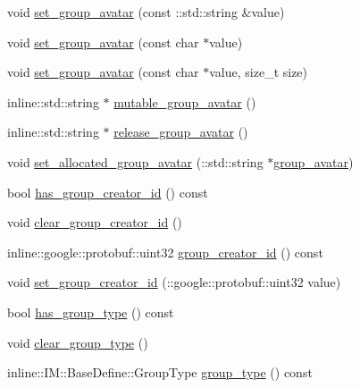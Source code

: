 \begin{DoxyCompactItemize}
\item 
void \hyperlink{class_i_m_1_1_base_define_1_1_server_group_info_a6ac57412cba2ce37fdc197b0bcbbd4cf}{set\+\_\+group\+\_\+avatar} (const \+::std\+::string \&value)
\item 
void \hyperlink{class_i_m_1_1_base_define_1_1_server_group_info_aa038fd8537aad3aeb0944e3b80ba553c}{set\+\_\+group\+\_\+avatar} (const char $\ast$value)
\item 
void \hyperlink{class_i_m_1_1_base_define_1_1_server_group_info_ae401920c52365b48745c3e2022de872e}{set\+\_\+group\+\_\+avatar} (const char $\ast$value, size\+\_\+t size)
\item 
inline\+::std\+::string $\ast$ \hyperlink{class_i_m_1_1_base_define_1_1_server_group_info_af7fc761d963367d50c0659c7ad2dbb3e}{mutable\+\_\+group\+\_\+avatar} ()
\item 
inline\+::std\+::string $\ast$ \hyperlink{class_i_m_1_1_base_define_1_1_server_group_info_a7e837a76cdb0013ca1742775cc7d073d}{release\+\_\+group\+\_\+avatar} ()
\item 
void \hyperlink{class_i_m_1_1_base_define_1_1_server_group_info_af8e1b545365bd809d3fb84736d2de052}{set\+\_\+allocated\+\_\+group\+\_\+avatar} (\+::std\+::string $\ast$\hyperlink{class_i_m_1_1_base_define_1_1_server_group_info_a136e37741411db26876e3e121ff4214e}{group\+\_\+avatar})
\item 
bool \hyperlink{class_i_m_1_1_base_define_1_1_server_group_info_a16f374888060d82abbfa6ca1db032d31}{has\+\_\+group\+\_\+creator\+\_\+id} () const 
\item 
void \hyperlink{class_i_m_1_1_base_define_1_1_server_group_info_a252e65040151a60d16d800ad28971c70}{clear\+\_\+group\+\_\+creator\+\_\+id} ()
\item 
inline\+::google\+::protobuf\+::uint32 \hyperlink{class_i_m_1_1_base_define_1_1_server_group_info_aadf7e21040e6cfa9d1b7faa70a4b9a20}{group\+\_\+creator\+\_\+id} () const 
\item 
void \hyperlink{class_i_m_1_1_base_define_1_1_server_group_info_a09d2b7727dd57baae9d377c88a5e9be2}{set\+\_\+group\+\_\+creator\+\_\+id} (\+::google\+::protobuf\+::uint32 value)
\item 
bool \hyperlink{class_i_m_1_1_base_define_1_1_server_group_info_abe22eab9029837da14a588aa573d528b}{has\+\_\+group\+\_\+type} () const 
\item 
void \hyperlink{class_i_m_1_1_base_define_1_1_server_group_info_af7ec5073b5415f2992f95ea02a871ca1}{clear\+\_\+group\+\_\+type} ()
\item 
inline\+::\+I\+M\+::\+Base\+Define\+::\+Group\+Type \hyperlink{class_i_m_1_1_base_define_1_1_server_group_info_a88444c681d4b8855383ec53c51827e21}{group\+\_\+type} () const 

\end{DoxyCompactItemize}
